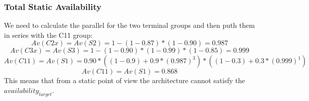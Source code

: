\subsubsection{Total Static Availability}
We need to calculate the parallel for the two terminal groups and then puth them in series with the C11 group:
\[Av(C2x) = Av(S2) = 1-(1-0.87)*(1-0.90) = 0.987\]
\[Av(C3x) = Av(S3) = 1-(1-0.90)*(1-0.99)*(1-0.85) = 0.999\]
\[Av(C11) = Av(S1) = 0.90 * ((1-0.9)+0.9*(0.987)^3)*((1-0.3) + 0.3*(0.999)^1)\]
\[Av(C11) = Av(S1) = 0.868\]
This means that from a static point of view the architecture cannot satisfy the \emph{$availability_{target}$}.